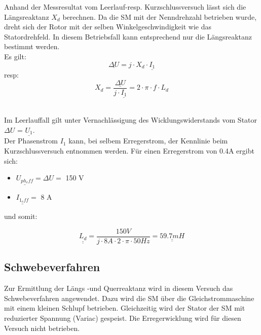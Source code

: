 \begin{flushleft}
Anhand der Messresultat vom Leerlauf-resp. Kurzschlussversuch lässt sich die Längsreaktanz $X_d$ berechnen. Da die SM mit der Nenndrehzahl betrieben wurde, dreht sich der Rotor mit der selben Winkelgeschwindigkeit wie das Statordrehfeld. In diesem Betriebsfall kann entsprechend nur die Längsreaktanz bestimmt werden.\\

Es gilt:\\

\vspace{0.3cm}
$$\underline{\Delta U} = j \cdot X_d \cdot \underline{I_1}$$
resp:\\
\vspace{0.3cm}
$$ X_d = \frac{\underline{\Delta U}}{j \cdot \underline{I_1}}  = 2 \cdot \pi \cdot f \cdot L_d$$\\

\vspace{0.5cm}


Im Leerlauffall gilt unter Vernachlässigung des Wicklungswiderstands vom Stator \\$\Delta U$ = $\underline{U_{1}}$. \\
Der Phasenstrom $I_1$ kann, bei selbem Erregerstrom, der Kennlinie beim Kurzschlussversuch entnommen werden. Für einen Erregerstrom von 0.4A ergibt sich:\\
\vspace{0.3cm}
\begin{itemize}
\item $\underline{U_{ph_eff}} = \Delta U = $ 150 V
\item $\underline{I_{1_eff}} = $ 8 A
\end{itemize}


und somit:

$$\underline{\underline{L_d}} = \frac{150 V }{j \cdot 8 A \cdot 2 \cdot \pi \cdot 50 Hz} = \underline{\underline{59.7 mH}}$$

\newpage



\subsection{Schwebeverfahren}
Zur Ermittlung der Längs -und Querreaktanz wird in diesem Versuch das Schwebeverfahren angewendet. Dazu wird die SM über die Gleichstrommaschine mit einem kleinen Schlupf betrieben. Gleichzeitig wird der Stator der SM mit reduzierter Spannung (Variac) gespeist. Die Erregerwicklung wird für diesen Versuch nicht betrieben.\\
\vspace{0.4cm}



\end{flushleft}
